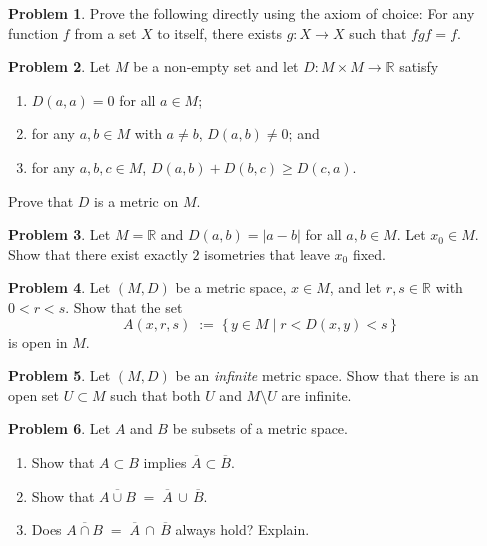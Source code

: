 \documentclass[10pt]{article}
\theoremstyle{definition} %
\newtheorem{problem}{Problem}
\theoremstyle{plain} %
\begin{document}
\begin{problem}
  Prove the following directly using the axiom of choice:  
  For any function $f$ from a set $X$ to itself, there exists $g : X \to X$ such that $fgf = f$.
\end{problem}

\begin{problem}
  Let $M$ be a non‑empty set and let $D : M \times M \to \mathbb{R}$ satisfy
  \begin{enumerate}[label=(\alph*)]
      \item $D(a,a) = 0$ for all $a \in M$;
      \item for any $a,b \in M$ with $a \ne b$, $D(a,b) \ne 0$; and
      \item for any $a,b,c \in M$, $D(a,b) + D(b,c) \ge D(c,a)$.
  \end{enumerate}
  Prove that $D$ is a metric on $M$.
\end{problem}

\begin{problem}
  Let $M = \mathbb{R}$ and $D(a,b) = \lvert a - b\rvert$ for all $a,b \in M$.  
  Let $x_0 \in M$.  Show that there exist exactly $2$ isometries that leave $x_0$ fixed.
\end{problem}
\begin{problem}
  Let $(M,D)$ be a metric space, $x \in M$, and let $r,s \in \mathbb{R}$ with $0 < r < s$.  
  Show that the set
  \[
      A(x,r,s) \;:=\; \{\,y \in M \mid r < D(x,y) < s\,\}
  \]
  is open in $M$.
\end{problem}

\begin{problem}
  Let $(M,D)$ be an \emph{infinite} metric space.  
  Show that there is an open set $U \subset M$ such that both $U$ and $M \setminus U$ are infinite.
\end{problem}

\begin{problem}
  Let $A$ and $B$ be subsets of a metric space.
  \begin{enumerate}[label=(\alph*)]
      \item Show that $A \subset B$ implies $\overline{A} \subset \overline{B}$.
      \item Show that $\overline{A \cup B} \;=\; \overline{A}\,\cup\,\overline{B}$.
      \item Does $\overline{A \cap B} \;=\; \overline{A}\,\cap\,\overline{B}$ always hold?  Explain.
  \end{enumerate}
\end{problem}
\end{document}
